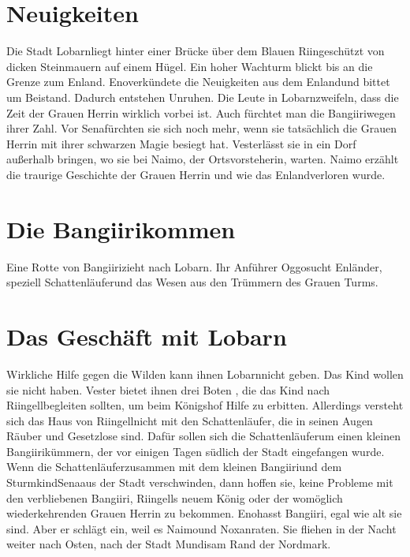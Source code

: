 \documentclass[12pt,a4paper,onecolumn,twoside,ngerman]{book}
\newcommand{\Sena}{Sena}
\newcommand{\Sturmkind}{Sturmkind}
\newcommand{\Bangiri}{Bangiiri}
\newcommand{\Oggo}{Oggo}
\newcommand{\Enland}{Enland}
\newcommand{\Enlaender}{Enländer}
\newcommand{\Schattenlaufer}{Schattenläufer}
\newcommand{\Eno}{Eno}
\newcommand{\Nox}{Nox}
\newcommand{\Lobarn}{Lobarn}
\newcommand{\Vester}{Vester}
\newcommand{\Naimo}{Naimo}
\newcommand{\Nordmark}{Nordmark}
\newcommand{\Rhingell}{Riingell}
\newcommand{\Mundis}{Mundis}
\newcommand{\Rhin}{Riin}
\begin{document}
\section{Neuigkeiten}
Die Stadt \Lobarn  liegt hinter einer Brücke über dem Blauen \Rhin  geschützt von dicken Steinmauern auf einem Hügel. Ein hoher Wachturm blickt bis an die Grenze zum \Enland .
\Eno  verkündete die Neuigkeiten aus dem \Enland  und bittet um Beistand. Dadurch entstehen Unruhen. Die Leute in \Lobarn  zweifeln, dass die Zeit der Grauen Herrin wirklich vorbei ist. Auch fürchtet man die \Bangiri  wegen ihrer Zahl. Vor \Sena  fürchten sie sich noch mehr, wenn sie tatsächlich die Grauen Herrin mit ihrer schwarzen Magie besiegt hat. 
\Vester  lässt sie in ein Dorf außerhalb bringen, wo sie bei \Naimo , der Ortsvorsteherin, warten. \Naimo
  erzählt die traurige Geschichte der Grauen Herrin und wie das \Enland verloren wurde.

\section{Die \Bangiri kommen}
Eine Rotte von \Bangiri  zieht nach \Lobarn . Ihr Anführer \Oggo  sucht \Enlaender , speziell \Schattenlaufer  und das Wesen aus den Trümmern des Grauen Turms. 

\section{Das Geschäft mit \Lobarn}
Wirkliche Hilfe gegen die Wilden kann ihnen \Lobarn nicht geben. Das Kind wollen sie nicht haben. \Vester 
  bietet ihnen drei Boten , die das Kind nach \Rhingell  begleiten sollten, um beim Königshof Hilfe zu erbitten. Allerdings versteht sich das Haus von \Rhingell nicht mit den \Schattenlaufer, die in seinen Augen Räuber und Gesetzlose sind. Dafür sollen sich die \Schattenlaufer  um einen kleinen \Bangiri   kümmern, der vor einigen Tagen südlich der Stadt eingefangen wurde. 
Wenn die \Schattenlaufer  zusammen mit dem kleinen \Bangiri  und dem \Sturmkind  \Sena  aus der Stadt verschwinden, dann hoffen sie, keine Probleme mit den verbliebenen \Bangiri , \Rhingell s neuem König oder der womöglich wiederkehrenden Grauen Herrin zu bekommen. 
\Eno  hasst \Bangiri , egal wie alt sie sind. Aber er schlägt ein, weil es \Naimo  und \Nox  anraten. Sie fliehen in der Nacht weiter nach Osten, nach der Stadt \Mundis  am Rand der \Nordmark .

\end{document}

